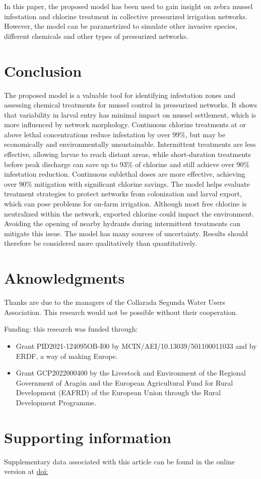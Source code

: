 \documentclass[review,authoryear]{elsarticle}
\begin{document}
In this paper, the proposed model has been used to gain insight on zebra mussel
infestation and chlorine treatment in collective pressurized irrigation
networks. However, the model can be parametrized to simulate other invasive
species, different chemicals and other types of pressurized networks.

\section{Conclusion}

The proposed model is a valuable tool for identifying infestation zones and
assessing chemical treatments for mussel control in pressurized networks. It
shows that variability in larval entry has minimal impact on mussel settlement,
which is more influenced by network morphology. Continuous chlorine treatments
at or above lethal concentrations reduce infestation by over 99\%, but may be
economically and environmentally unsustainable. Intermittent treatments are less
effective, allowing larvae to reach distant areas, while short-duration
treatments before peak discharge can save up to 93\% of chlorine and still
achieve over 90\% infestation reduction. Continuous sublethal doses are more
effective, achieving over 90\% mitigation with significant chlorine savings. The
model helps evaluate treatment strategies to protect networks from colonization
and larval export, which can pose problems for on-farm irrigation. Although most
free chlorine is neutralized within the network, exported chlorine could impact
the environment. Avoiding the opening of nearby hydrants during intermittent
treatments can mitigate this issue. The model has many sources of uncertainty.
Results should therefore be considered more qualitatively than quantitatively.

\section*{Aknowledgments}

Thanks are due to the managers of the Collarada Segunda Water Users Association.
This research would not be possible without their cooperation.

Funding: this research was funded through:
\begin{itemize}
\item Grant PID2021-124095OB-I00 by MCIN/AEI/10.13039/501100011033 and by ERDF,
	a way of making Europe.
\item Grant GCP2022000400 by the Livestock and Environment of the Regional
	Government of Aragón and the European Agricultural Fund for Rural
	Development (EAFRD) of the European Union through the Rural Development
	Programme.
\end{itemize}

\appendix
\section{Supporting information}
Supplementary data associated with this article can be found in the online
version at \url{doi:}



\end{document}
